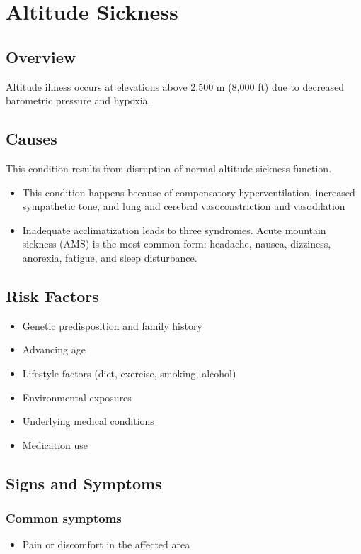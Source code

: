 \chapter{Altitude Sickness}
\label{sec:Altitude Sickness}

\section{Overview}
Altitude illness occurs at elevations above 2,500 m (8,000 ft) due to decreased barometric pressure and hypoxia.
\section{Causes}
This condition results from disruption of normal altitude sickness function.

\begin{itemize}[noitemsep]
  \item This condition happens because of compensatory hyperventilation, increased sympathetic tone, and lung and cerebral vasoconstriction and vasodilation
  \item Inadequate acclimatization leads to three syndromes. Acute mountain sickness (AMS) is the most common form: headache, nausea, dizziness, anorexia, fatigue, and sleep disturbance.
\end{itemize}
\section{Risk Factors}


\begin{itemize}[noitemsep]
  \item Genetic predisposition and family history
  \item Advancing age
  \item Lifestyle factors (diet, exercise, smoking, alcohol)
  \item Environmental exposures
  \item Underlying medical conditions
  \item Medication use
\end{itemize}
\section{Signs and Symptoms}

\subsection{Common symptoms}
\begin{itemize}[noitemsep]
  \item Pain or discomfort in the affected area
  \end{itemize}

